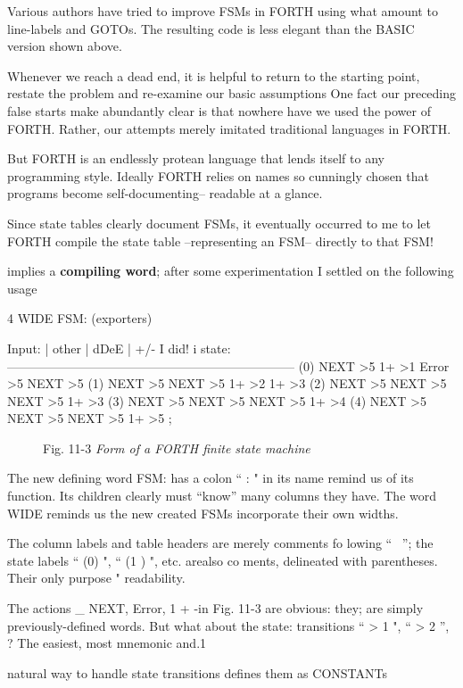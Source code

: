 Various authors have tried to improve FSMs in FORTH using what amount to line-labels and GOTOs. The resulting code is less elegant than the BASIC version shown above.

Whenever we reach a dead end, it is helpful to return to the starting point, restate the problem and re-examine our basic assumptions One fact our preceding false starts make abundantly clear is that nowhere have we used the power of FORTH. Rather, our attempts merely imitated traditional languages in FORTH.

But FORTH is an endlessly protean language that lends itself to any programming style. Ideally FORTH relies on names so cunningly chosen that programs become self-documenting-- readable at a glance.

Since state tables clearly document FSMs, it eventually occurred to me to let FORTH compile the state table --representing an FSM-- directly to that FSM!

 implies a \textbf{compiling word}; after some experimentation I settled on the following usage

4 WIDE FSM: (exporters)

Input: | other | dDeE | +/- I did! i
state: ———————————————————————
(0) NEXT >5 1+ >1 Error >5 NEXT >5
(1) NEXT >5 NEXT >5 1+ >2 1+ >3
(2) NEXT >5 NEXT >5 NEXT >5 1+ >3
(3) NEXT >5 NEXT >5 NEXT >5 1+ >4
(4) NEXT >5 NEXT >5 NEXT >5 1+ >5 ;

\begin{figure}
    \caption{Fig. 11-3 \textit{Form of a FORTH finite state machine}}
\end{figure}

The new defining word FSM: has a colon “ : " in its name
remind us of its function. Its children clearly must “know”
many columns they have. The word WIDE reminds us the new
created FSMs incorporate their own widths.

The column labels and table headers are merely comments fo
lowing “ \ ”; the state labels “ (0) ", “ (1 ) ", etc. arealso co
ments, delineated with parentheses. Their only purpose "
readability.

The actions \_ NEXT, Error, 1 + -in Fig. 11-3 are obvious: they;
are simply previously-defined words. But what about the state:
transitions “ > 1 ", “ > 2 ”, ? The easiest, most mnemonic and.1

natural way to handle state transitions defines them as CONSTANTs

